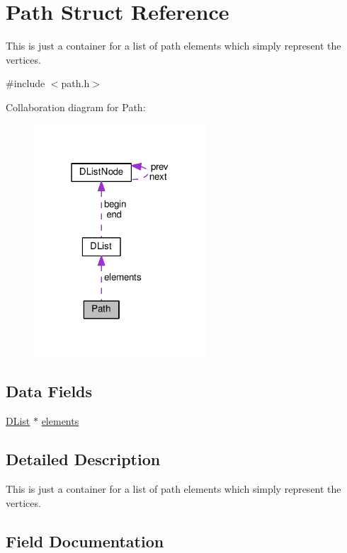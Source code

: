 \hypertarget{structPath}{}\section{Path Struct Reference}
\label{structPath}


This is just a container for a list of path elements which simply represent the vertices.  




{\ttfamily \#include $<$path.\+h$>$}



Collaboration diagram for Path\+:\nopagebreak
\begin{figure}[H]
\begin{center}
\leavevmode
\includegraphics[width=183pt]{structPath__coll__graph}
\end{center}
\end{figure}
\subsection*{Data Fields}
\begin{DoxyCompactItemize}
\item 
\hyperlink{structDList}{D\+List} $\ast$ \hyperlink{structPath_a9767e852a01fe98f15198cc23538aad0}{elements}
\end{DoxyCompactItemize}


\subsection{Detailed Description}
This is just a container for a list of path elements which simply represent the vertices. 

\subsection{Field Documentation}
